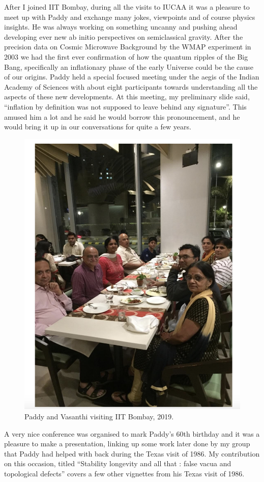 \documentclass[prd, preprint, longbibliography, 11pt]{revtex4-1}
\begin{document}
After I joined IIT Bombay, during all the visits to IUCAA it was a pleasure to meet up with Paddy and exchange many jokes, viewpoints and of course physics insights. He was always working on something uncanny and pushing ahead developing ever new ab initio perspectives on semiclassical gravity.  After the precision data on Cosmic Microwave Background by the WMAP experiment in 2003 we had the first ever confirmation of how the quantum ripples of the Big Bang, specifically an inflationary phase of the early Universe could be the cause of our origins. Paddy held a special focused meeting under the aegis of the Indian Academy of Sciences with about eight participants towards understanding all the aspects of these new developments. At this meeting, my preliminary slide said, “inflation by definition was not supposed to leave behind any signature”. This amused him a lot and he said he would borrow this pronouncement, and he would bring it up in our conversations for quite a few years. 
\begin{figure}[!h]
\centering
\includegraphics[width=12.00cm]{pviitbombay.png}
\caption*{Paddy and Vasanthi visiting IIT Bombay, 2019.} 
\end{figure}
A very nice conference was organised to mark Paddy’s 60th birthday and it was a pleasure to make a presentation, linking up some work later done by my group that Paddy had helped with back during the Texas visit of 1986. My contribution on this occasion, titled “Stability longevity and all that : false vacua and topological defects” covers a few other vignettes from his Texas visit of 1986.
\end{document}
